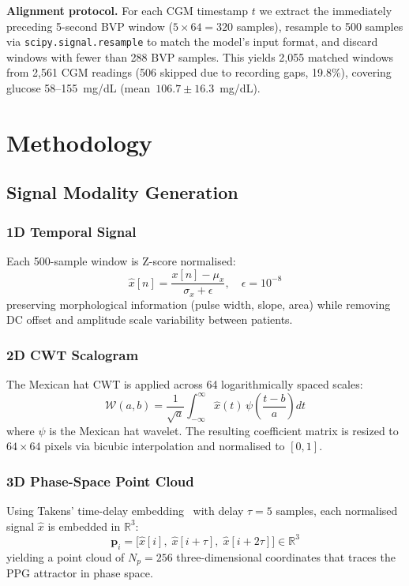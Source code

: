 \documentclass[conference]{IEEEtran}
\begin{document}
\textbf{Alignment protocol.}
For each CGM timestamp $t$ we extract the immediately preceding 5-second BVP
window ($5\times64=320$ samples), resample to 500 samples via
\texttt{scipy.signal.resample} to match the model's input format,
and discard windows with fewer than 288 BVP samples.
This yields 2,055 matched windows from 2,561 CGM readings
(506 skipped due to recording gaps, 19.8\%),
covering glucose 58--155~mg/dL (mean~$106.7\pm16.3$~mg/dL).

\section{Methodology}
\label{sec:method}

\subsection{Signal Modality Generation}

\subsubsection{1D Temporal Signal}
Each 500-sample window is Z-score normalised:
\begin{equation}
  \hat{x}[n] = \frac{x[n] - \mu_x}{\sigma_x + \epsilon}, \quad \epsilon=10^{-8}
  \label{eq:zscore}
\end{equation}
preserving morphological information (pulse width, slope, area) while removing
DC offset and amplitude scale variability between patients.

\subsubsection{2D CWT Scalogram}
The Mexican hat CWT is applied across 64 logarithmically spaced scales:
\begin{equation}
  \mathcal{W}(a, b) = \frac{1}{\sqrt{a}} \int_{-\infty}^{\infty}
    \hat{x}(t)\, \psi\!\left(\frac{t-b}{a}\right) dt
  \label{eq:cwt}
\end{equation}
where $\psi$ is the Mexican hat wavelet.
The resulting coefficient matrix is resized to $64\times64$ pixels via
bicubic interpolation and normalised to $[0,1]$.

\subsubsection{3D Phase-Space Point Cloud}
Using Takens' time-delay embedding~\cite{takens1981} with delay $\tau=5$
samples, each normalised signal $\hat{x}$ is embedded in $\mathbb{R}^3$:
\begin{equation}
  \mathbf{p}_i = \bigl[\hat{x}[i],\; \hat{x}[i+\tau],\; \hat{x}[i+2\tau]\bigr]
                 \in \mathbb{R}^3
  \label{eq:takens}
\end{equation}
yielding a point cloud of $N_{p}=256$ three-dimensional coordinates that
traces the PPG attractor in phase space.
\end{document}
